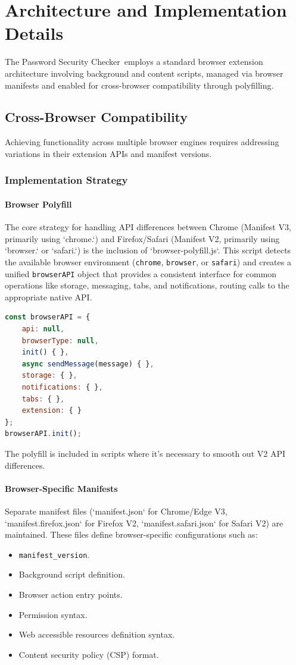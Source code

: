 \documentclass[11pt,oneside,a4paper]{book}
\newcommand{\extensionname}{Password Security Checker}
\begin{document}
\chapter{Architecture and Implementation Details}
The \extensionname\ employs a standard browser extension architecture involving background and content scripts, managed via browser manifests and enabled for cross-browser compatibility through polyfilling.

\section{Cross-Browser Compatibility}
Achieving functionality across multiple browser engines requires addressing variations in their extension APIs and manifest versions.

\subsection{Implementation Strategy}
\subsubsection{Browser Polyfill}
The core strategy for handling API differences between Chrome (Manifest V3, primarily using `chrome.`) and Firefox/Safari (Manifest V2, primarily using `browser.` or `safari.`) is the inclusion of `browser-polyfill.js`. This script detects the available browser environment (\texttt{chrome}, \texttt{browser}, or \texttt{safari}) and creates a unified \texttt{browserAPI} object that provides a consistent interface for common operations like storage, messaging, tabs, and notifications, routing calls to the appropriate native API.
\begin{lstlisting}[language=JavaScript, caption=browser-polyfill.js Snippet]
const browserAPI = {
    api: null,
    browserType: null,
    init() { },
    async sendMessage(message) { },
    storage: { },
    notifications: { },
    tabs: { },
    extension: { }
};
browserAPI.init();
\end{lstlisting}
The polyfill is included in scripts where it's necessary to smooth out V2 API differences.

\subsubsection{Browser-Specific Manifests}
Separate manifest files (`manifest.json` for Chrome/Edge V3, `manifest.firefox.json` for Firefox V2, `manifest.safari.json` for Safari V2) are maintained. These files define browser-specific configurations such as:
\begin{itemize}
    \item \texttt{manifest\_version}.
    \item Background script definition.
    \item Browser action entry points.
    \item Permission syntax.
    \item Web accessible resources definition syntax.
    \item Content security policy (CSP) format.
\end{itemize}
\end{document}

